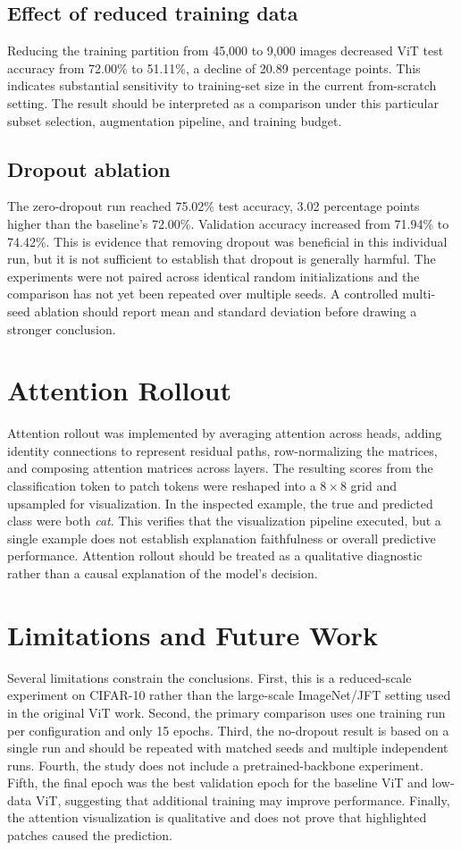 \documentclass[conference]{IEEEtran}
\begin{document}
\subsection{Effect of reduced training data}
Reducing the training partition from 45,000 to 9,000 images decreased ViT test accuracy from 72.00\% to 51.11\%, a decline of 20.89 percentage points. This indicates substantial sensitivity to training-set size in the current from-scratch setting. The result should be interpreted as a comparison under this particular subset selection, augmentation pipeline, and training budget.

\subsection{Dropout ablation}
The zero-dropout run reached 75.02\% test accuracy, 3.02 percentage points higher than the baseline's 72.00\%. Validation accuracy increased from 71.94\% to 74.42\%. This is evidence that removing dropout was beneficial in this individual run, but it is not sufficient to establish that dropout is generally harmful. The experiments were not paired across identical random initializations and the comparison has not yet been repeated over multiple seeds. A controlled multi-seed ablation should report mean and standard deviation before drawing a stronger conclusion.

\section{Attention Rollout}
Attention rollout was implemented by averaging attention across heads, adding identity connections to represent residual paths, row-normalizing the matrices, and composing attention matrices across layers. The resulting scores from the classification token to patch tokens were reshaped into a $8 \times 8$ grid and upsampled for visualization. In the inspected example, the true and predicted class were both \emph{cat}. This verifies that the visualization pipeline executed, but a single example does not establish explanation faithfulness or overall predictive performance. Attention rollout should be treated as a qualitative diagnostic rather than a causal explanation of the model's decision.

\section{Limitations and Future Work}
Several limitations constrain the conclusions. First, this is a reduced-scale experiment on CIFAR-10 rather than the large-scale ImageNet/JFT setting used in the original ViT work. Second, the primary comparison uses one training run per configuration and only 15 epochs. Third, the no-dropout result is based on a single run and should be repeated with matched seeds and multiple independent runs. Fourth, the study does not include a pretrained-backbone experiment. Fifth, the final epoch was the best validation epoch for the baseline ViT and low-data ViT, suggesting that additional training may improve performance. Finally, the attention visualization is qualitative and does not prove that highlighted patches caused the prediction.
\end{document}
